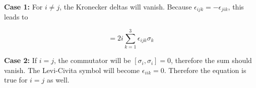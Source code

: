 \documentclass[a4paper,german,12pt,smallheadings]{scrartcl}
\begin{document}
\begin{enumerate}[a)]
    \textbf{Case 1:} For $i \neq j$, the Kronecker deltas will vanish.  Because $\epsilon_{ijk}
    = -\epsilon_{jik}$, this leads to

    \begin{equation*}
      [\sigma_i, \sigma_j] = 2i \sum_{k=1}^3 \epsilon_{ijk} \sigma_k
    \end{equation*}

    \textbf{Case 2:} If $i=j$, the commutator will be $[\sigma_i, \sigma_i] =
    0$, therefore the sum should vanish. The Levi-Civita symbol will
    become $\epsilon_{iik} = 0$. Therefore the equation is true for $i = j$ as
    well.
\end{enumerate}
\end{document}
